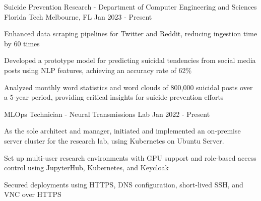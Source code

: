 \begin{cventries}
	\vspace{-1mm}
	\cventry
	{Suicide Prevention Research - Department of Computer Engineering and Sciences}
	{Florida Tech}
	{Melbourne, FL}
	{Jan 2023 - Present}
	{\begin{cvitems}
			\item {Enhanced data scraping pipelines for Twitter and Reddit, reducing ingestion time by 60 times}
			\item {Developed a prototype model for predicting suicidal tendencies from social media posts using NLP features, achieving an accuracy rate of 62\%}
			\item {Analyzed monthly word statistics and word clouds of 800,000 suicidal posts over a 5-year period,  providing critical insights for suicide prevention efforts}
		\end{cvitems}}
	\vspace{1mm}
	\cventry
	{MLOps Technician - Neural Transmissions Lab}
	{}
	{}
	{Jan 2022 - Present}
	{\begin{cvitems}
			\item {As the sole architect and manager, initiated and implemented an on-premise server cluster for the research lab, using Kubernetes on Ubuntu Server.}
			\item {Set up multi-user research environments with GPU support and role-based access control using JupyterHub, Kubernetes, and Keycloak}
			\item {Secured deployments using HTTPS, DNS configuration, short-lived SSH, and VNC over HTTPS}
		\end{cvitems}}
	\vspace{1mm}

	\vspace{-1mm}


\end{cventries}